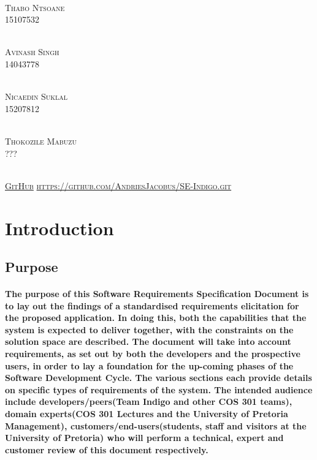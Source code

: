 \documentclass[runningheads,a4paper]{llncs}
\begin{document}
\begin{titlepage}
\begin{center}
\begin{multicols}{2}
				
				\textsc{\large\\
					Thabo Ntsoane\\
					15107532\\
				}
				
				\columnbreak
				
				\textsc{\large\\
					 Avinash Singh\\
					14043778\\
				}
				
				\textsc{\large\\
					Nicaedin Suklal\\
					15207812\\
				}

				
				\textsc{\large\\
					Thokozile Mabuzu\\
					???\\
				}
				
			\end{multicols}
			
			
			\textsc{	\\ \href{https://github.com/AndriesJacobus/SE-Indigo}{GitHub}
				\url{https://github.com/AndriesJacobus/SE-Indigo.git}}
			
		\end{center}
	\end{titlepage}

\begingroup

\tableofcontents
{}
\endgroup
\newpage


\section{Introduction}

\subsection{Purpose}
\paragraph*{The purpose of this Software Requirements Specification Document is to lay out the findings of a standardised requirements elicitation for the proposed application. In doing this, both the capabilities that the system is expected to deliver together, with the constraints on the solution space are described. The document will take into account requirements, as set out by both the developers and the prospective users, in order to lay a foundation for the up-coming phases of the Software Development Cycle. The various sections each provide details on specific types of requirements of the system. The intended audience include developers/peers(Team Indigo and other COS 301 teams), domain experts(COS 301 Lectures and the University of Pretoria Management), customers/end-users(students, staff and visitors at the University of Pretoria) who will perform a technical, expert  and customer review of this document respectively. }
\end{document}

